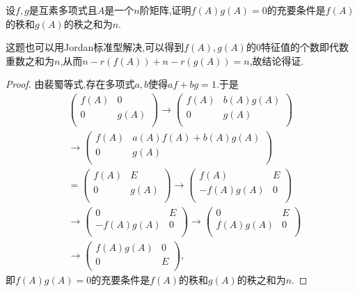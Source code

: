 \documentclass[../../main.tex]{subfiles}
\begin{document}
\begin{example}
设\( f,g \)是互素多项式且\( A \)是一个\( n \)阶矩阵,证明\( f(A)g(A)=0 \)的充要条件是\( f(A) \)的秩和\( g(A) \)的秩之和为\( n \).
\end{example}
\begin{note}
这题也可以用Jordan标准型解决,可以得到$f(A),g(A)$的0特征值的个数即代数重数之和为$n$,从而$n-r(f(A))+n-r(g(A))=n$,故结论得证.
\end{note}
\begin{proof}
由裴蜀等式,存在多项式\( a,b \)使得\( af + bg = 1 \).于是
\begin{align*}
&\left( \begin{matrix}
f(A)&		0\\
0&		g(A)\\
\end{matrix} \right) \rightarrow \left( \begin{matrix}
f(A)&		b(A)g(A)\\
0&		g(A)\\
\end{matrix} \right) 
\\
&\rightarrow \left( \begin{matrix}
f(A)&		a(A)f(A)+b(A)g(A)\\
0&		g(A)\\
\end{matrix} \right) 
\\
&=\left( \begin{matrix}
f(A)&		E\\
0&		g(A)\\
\end{matrix} \right) \rightarrow \left( \begin{matrix}
f(A)&		E\\
-f(A)g(A)&		0\\
\end{matrix} \right) 
\\
&\rightarrow \left( \begin{matrix}
0&		E\\
-f(A)g(A)&		0\\
\end{matrix} \right) \rightarrow \left( \begin{matrix}
0&		E\\
f(A)g(A)&		0\\
\end{matrix} \right) 
\\
&\rightarrow \left( \begin{matrix}
f(A)g(A)&		0\\
0&		E\\
\end{matrix} \right) ,
\end{align*}
即\( f(A)g(A)=0 \)的充要条件是\( f(A) \)的秩和\( g(A) \)的秩之和为\( n \).
\end{proof}
\end{document}

